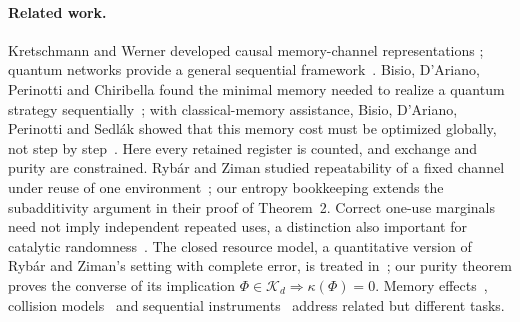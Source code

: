 \documentclass[11pt,a4paper]{article}
\theoremstyle{plain}
\theoremstyle{definition}
\theoremstyle{remark}
\begin{document}
\paragraph{Related work.}
Kretschmann and Werner developed causal memory-channel representations
\cite{KretschmannWerner2005}; quantum networks provide a general sequential
framework~\cite{Chiribella2009}. Bisio, D'Ariano, Perinotti and Chiribella found
the minimal memory needed to realize a quantum strategy sequentially~\cite{Bisio2011};
with classical-memory assistance, Bisio, D'Ariano, Perinotti and Sedl\'ak showed that
this memory cost must be optimized globally, not step by step~\cite{Bisio2012}. Here every retained register is counted,
and exchange and purity are constrained. Ryb\'ar and Ziman studied repeatability
of a fixed channel under reuse of one environment~\cite{RybarZiman2008}; our entropy bookkeeping extends the subadditivity argument in their
proof of Theorem~2.
Correct one-use marginals need not imply independent repeated uses, a distinction
also important for catalytic randomness~\cite{BoesWilming2018,LieJeong2021}. The closed
resource model, a quantitative version of Ryb\'ar and Ziman's setting with complete error,
is treated in~\cite{Douglas2026closed}; our purity theorem proves the converse of its
implication $\Phi\in\mathcal K_d\Rightarrow\kappa(\Phi)=0$. Memory effects~\cite{CGLM2014,Zammit2025}, collision models~\cite{CLGP2022} and sequential
instruments~\cite{SauSedlak2025} address related but different tasks.
\end{document}
